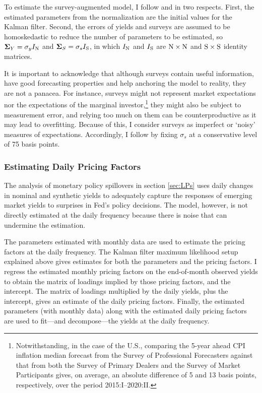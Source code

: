 {To estimate the survey-augmented model, I follow \cite{Guimaraes:2014} and \cite{Lloyd:2020} in two respects. First, the estimated parameters from the \cite{JSZ:2011} normalization are the initial values for the Kalman filter.
Second, the errors of yields and surveys are assumed to be homoskedastic to reduce the number of parameters to be estimated, so \(\mathbf{\mathbf{\Sigma}}_{Y} = \sigma_y I_{\mathrm{N}}\) and \(\mathbf{\mathbf{\Sigma}}_{S} = \sigma_s I_{\mathrm{S}}\), in which \(I_{\mathrm{N}}\) and \(I_{\mathrm{S}}\) are \(\mathrm{N} \times \mathrm{N}\) and \(\mathrm{S} \times \mathrm{S}\) identity matrices. 

It is important to acknowledge that although surveys contain useful information, have good forecasting properties and help anchoring the model to reality, they are not a panacea. 
For instance, surveys might not represent market expectations nor the expectations of the marginal investor,\footnote{Notwithstanding, in the case of the U.S., comparing the 5-year ahead CPI inflation median forecast from the Survey of Professional Forecasters against that from both the Survey of Primary Dealers and the Survey of Market Participants gives, on average, an absolute difference of 5 and 13 basis points, respectively, over the period 2015:I--2020:II.} they might also be subject to measurement error, %
and relying too much on them can be counterproductive as it may lead to overfitting.
Because of this, I consider surveys as imperfect or `noisy' measures of expectations. 
Accordingly, I follow \cite{KimOrphanides:2012} by fixing \(\sigma_s\) at a conservative level of 75 basis points. 


\subsubsection{Estimating Daily Pricing Factors}
\iftoggle{toclinks}{\gototoc}{} %

The analysis of monetary policy spillovers in section \ref{sec:LPs} uses daily changes in nominal and synthetic yields to adequately capture the responses of emerging market yields to surprises in Fed's policy decisions. 
The model, however, is not directly estimated at the daily frequency because there is noise that can undermine the estimation. 

The parameters estimated with monthly data are used to estimate the pricing factors at the daily frequency. 
The Kalman filter maximum likelihood setup explained above gives estimates for both the parameters and the pricing factors. 
I regress the estimated monthly pricing factors on the end-of-month observed yields to obtain the matrix of loadings implied by those pricing factors, and the intercept. 
The matrix of loadings multiplied by the daily yields, plus the intercept, gives an estimate of the daily pricing factors. 
Finally, the estimated parameters (with monthly data) along with the estimated daily pricing factors are used to fit---and decompose---the yields at the daily frequency.

}
